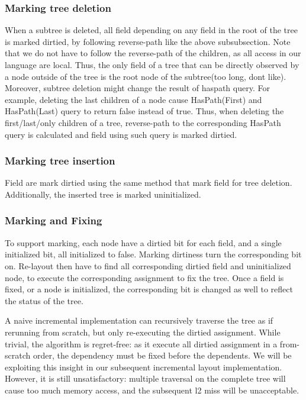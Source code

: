 \documentclass[format=acmsmall, review=false, screen=true]{acmart}
\begin{document}
\subsubsection{Marking tree deletion}
When a subtree is deleted, all field depending on any field in the root of the tree is marked dirtied, by following reverse-path like the above subsubsection. Note that we do not have to follow the reverse-path of the children, as all access in our language are local. Thus, the only field of a tree that can be directly observed by a node outside of the tree is the root node of the subtree(too long, dont like). Moreover, subtree deletion might change the result of haspath query. For example, deleting the last children of a node cause HasPath(First) and HasPath(Last) query to return false instead of true. Thus, when deleting the first/last/only children of a tree, reverse-path to the corresponding HasPath query is calculated and field using such query is marked dirtied.
\subsubsection{Marking tree insertion}
Field are mark dirtied using the same method that mark field for tree deletion. Additionally, the inserted tree is marked uninitialized.

\subsubsection{Marking and Fixing}
To support marking, each node have a dirtied bit for each field, and a single initialized bit, all initialized to false. Marking dirtiness turn the corresponding bit on. Re-layout then have to find all corresponding dirtied field and uninitialized node, to execute the corresponding assignment to fix the tree. Once a field is fixed, or a node is initialized, the corresponding bit is changed as well to reflect the status of the tree.

A naive incremental implementation can recursively traverse the tree as if rerunning from scratch, but only re-executing the dirtied assignment. While trivial, the algorithm is regret-free: as it execute all dirtied assignment in a from-scratch order, the dependency must be fixed before the dependents. We will be exploiting this insight in our subsequent incremental layout implementation. However, it is still unsatisfactory: multiple traversal on the complete tree will cause too much memory access, and the subsequent l2 miss will be unacceptable.
\end{document}
